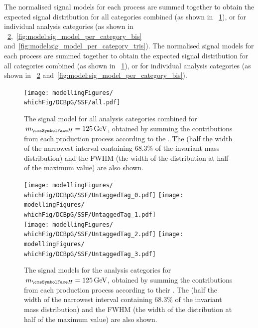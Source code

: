 \ifNewAnalysis
The normalised signal models for each process are summed together to obtain the expected signal \mgg distribution for all categories combined (as shown in \Fig\s~\ref{fig:model:sig_model_all}), or for individual analysis categories (as shown in \Fig\s~\ref{fig:model:sig_model_per_category},~\ref{fig:model:sig_model_per_category_bis} and~\ref{fig:model:sig_model_per_category_tris}).
\else
The normalised signal models for each process are summed together to obtain the expected signal \mgg distribution for all categories combined (as shown in \Fig\s~\ref{fig:model:sig_model_all}), or for individual analysis categories (as shown in \Fig\s~\ref{fig:model:sig_model_per_category} and~\ref{fig:model:sig_model_per_category_bis}).
\fi
\begin{figure}[ht!]
\centering
\texttt{[image: modellingFigures/\\whichFig/DCBpG/SSF/all.pdf]} 

\caption{The signal model for all analysis categories combined for $\mH=125\GeV$, obtained by summing the contributions from each production process according to the \effxacc. The \effSigma (half the width of the narrowest interval containing 68.3\% of the invariant mass distribution) and the FWHM (the width of the distribution at half of the maximum value) are also shown. }

\label{fig:model:sig_model_all}
\end{figure}

\begin{figure}[htp!]
\centering
\texttt{[image: modellingFigures/\\whichFig/DCBpG/SSF/UntaggedTag\_0.pdf]} 
\texttt{[image: modellingFigures/\\whichFig/DCBpG/SSF/UntaggedTag\_1.pdf]} \\
\texttt{[image: modellingFigures/\\whichFig/DCBpG/SSF/UntaggedTag\_2.pdf]} 
\texttt{[image: modellingFigures/\\whichFig/DCBpG/SSF/UntaggedTag\_3.pdf]} \\ 

\caption{The signal models for the \Untagged analysis categories for $\mH=125\GeV$, obtained by summing the contributions from each production process according to their \effxacc. The \effSigma (half the width of the narrowest interval containing 68.3\% of the invariant mass distribution) and the FWHM (the width of the distribution at half of the maximum value) are also shown.}

\label{fig:model:sig_model_per_category}
\end{figure}

